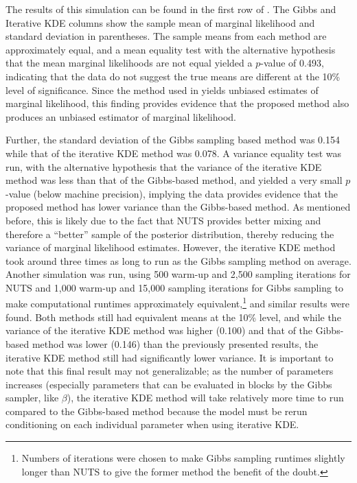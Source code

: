 \documentclass[twocolumn]{article}
\begin{document}
The results of this simulation can be found in the first row of . The Gibbs and Iterative KDE columns show the sample mean of marginal likelihood and standard deviation in parentheses. The sample means from each method are approximately equal, and a mean equality test with the alternative hypothesis that the mean marginal likelihoods are not equal yielded a $p$-value of 0.493, indicating that the data do not suggest the true means are different at the 10\% level of significance. Since the method used in \cite{Chib} yields unbiased estimates of marginal likelihood, this finding provides evidence that the proposed method also produces an unbiased estimator of marginal likelihood.

Further, the standard deviation of the Gibbs sampling based method was 0.154 while that of the iterative KDE method was 0.078. A variance equality test was run, with the alternative hypothesis that the variance of the iterative KDE method was less than that of the Gibbs-based method, and yielded a very small $p$-value (below machine precision), implying the data provides evidence that the proposed method has lower variance than the Gibbs-based method. As mentioned before, this is likely due to the fact that NUTS provides better mixing and therefore a ``better'' sample of the posterior distribution, thereby reducing the variance of marginal likelihood estimates. However, the iterative KDE method took around three times as long to run as the Gibbs sampling method on average. Another simulation was run, using 500 warm-up and 2,500 sampling iterations for NUTS and 1,000 warm-up and 15,000 sampling iterations for Gibbs sampling to make computational runtimes approximately equivalent,\footnote{Numbers of iterations were chosen to make Gibbs sampling runtimes slightly longer than NUTS to give the former method the benefit of the doubt.} and similar results were found. Both methods still had equivalent means at the 10\% level, and while the variance of the iterative KDE method was higher (0.100) and that of the Gibbs-based method was lower (0.146) than the previously presented results, the iterative KDE method still had significantly lower variance. It is important to note that this final result may not generalizable; as the number of parameters increases (especially parameters that can be evaluated in blocks by the Gibbs sampler, like $\beta$), the iterative KDE method will take relatively more time to run compared to the Gibbs-based method because the model must be rerun conditioning on each individual parameter when using iterative KDE.
\end{document}
